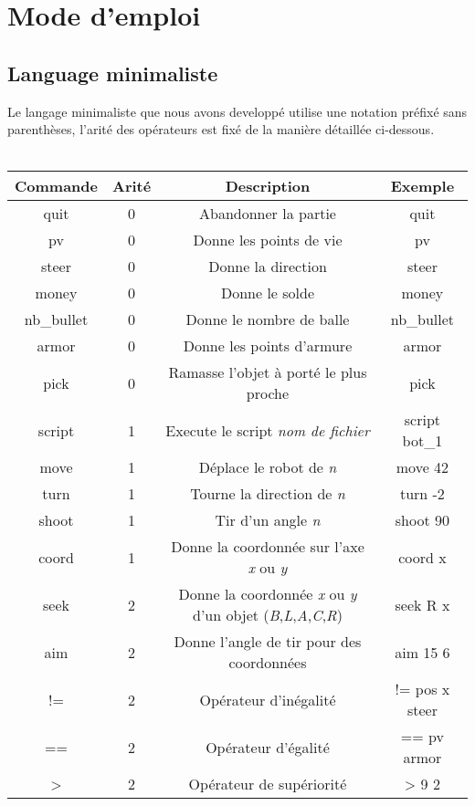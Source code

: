 \documentclass[a4paper, 11pt]{article}
\begin{document}
\newpage
\section{Mode d'emploi}
\subsection{Language minimaliste}
Le langage minimaliste que nous avons developpé utilise une notation préfixé sans parenthèses, l'arité des opérateurs est fixé de la manière détaillée ci-dessous.\\\\
\begin{tabular}{|c|c|c|c|}
   \hline
   Commande & Arité & Description & Exemple \\
	 \hline
   quit & 0 & Abandonner la partie & quit \\
   \hline
   pv & 0 & Donne les points de vie & pv \\
   \hline
	 steer & 0 & Donne la direction & steer \\
	 \hline
   money & 0 & Donne le solde & money \\
   \hline
   nb\_bullet & 0 & Donne le nombre de balle & nb\_bullet \\
   \hline
	 armor & 0 & Donne les points d'armure & armor \\
	 \hline
	 pick & 0 & Ramasse l'objet à porté le plus proche & pick \\
   \hline
	 script & 1 & Execute le script \emph{nom de fichier} & script bot\_1 \\
   \hline
   move & 1 & Déplace le robot de \emph{n} & move 42 \\
   \hline
	 turn & 1 & Tourne la direction de \emph{n} & turn -2 \\
	 \hline
   shoot & 1 & Tir d'un angle \emph{n} & shoot 90 \\
   \hline
   coord & 1 & Donne la coordonnée sur l'axe \emph{x} ou \emph{y} & coord x \\
   \hline
	 seek & 2 & Donne la coordonnée \emph{x} ou \emph{y} d'un objet (\emph{B},\emph{L},\emph{A},\emph{C},\emph{R}) & seek R x \\
   \hline
	 aim & 2 & Donne l'angle de tir pour des coordonnées & aim 15 6 \\
   \hline
	 != & 2 & Opérateur d'inégalité & != pos x steer \\
	 \hline
   == & 2 & Opérateur d'égalité  & == pv armor \\
   \hline
   > & 2 & Opérateur de supériorité  & > 9 2 \\

\end{tabular}
\end{document}
